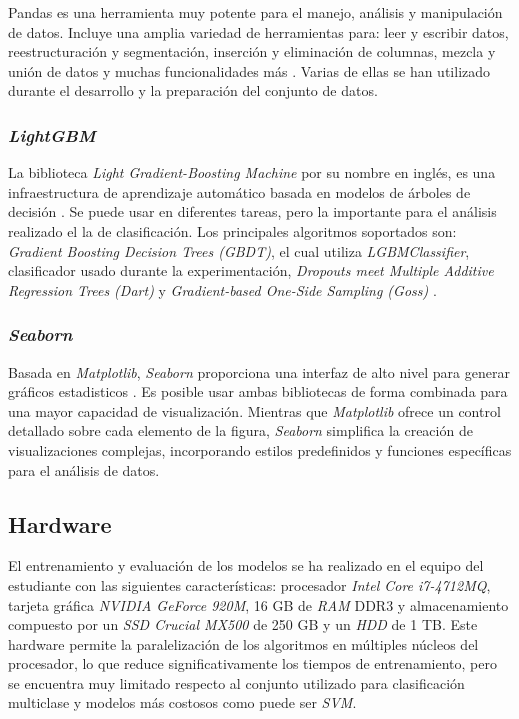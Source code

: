 Pandas es una herramienta muy potente para el manejo, análisis y manipulación de datos. Incluye una amplia variedad de herramientas para: leer y escribir datos, reestructuración y segmentación, inserción y eliminación de columnas, mezcla y unión de datos y muchas funcionalidades más \cite{pandas}. Varias de ellas se han utilizado durante el desarrollo y la preparación del conjunto de datos.

\subsubsection{\textit{LightGBM}}
\label{subsubsec:lightgbm}

La biblioteca \textit{Light Gradient-Boosting Machine} por su nombre en inglés, es una infraestructura de aprendizaje automático basada en modelos de árboles de decisión \cite{lgbm}. Se puede usar en diferentes tareas, pero la importante para el análisis realizado el la de clasificación. Los principales algoritmos soportados son: \textit{Gradient Boosting Decision Trees (GBDT)}, el cual utiliza \textit{LGBMClassifier}, clasificador usado durante la experimentación, \textit{Dropouts meet Multiple Additive Regression Trees (Dart)} y \textit{Gradient-based One-Side Sampling (Goss)} \cite{lgbm_alg}.

\subsubsection{\textit{Seaborn}}
\label{subsubsec:seaborn}

Basada en \textit{Matplotlib}, \textit{Seaborn} proporciona una interfaz de alto nivel para generar gráficos estadisticos \cite{seaborn}. Es posible usar ambas bibliotecas de forma combinada para una mayor capacidad de visualización. Mientras que \textit{Matplotlib} ofrece un control detallado sobre cada elemento de la figura, \textit{Seaborn} simplifica la creación de visualizaciones complejas, incorporando estilos predefinidos y funciones específicas para el análisis de datos.

\subsection{Hardware}
\label{subsec:hw_usado}

El entrenamiento y evaluación de los modelos se ha realizado en el equipo del estudiante con las siguientes características: procesador \textit{Intel Core i7-4712MQ}, tarjeta gráfica \textit{NVIDIA GeForce 920M}, 16 GB de \textit{RAM} DDR3 y almacenamiento compuesto por un \textit{SSD Crucial MX500} de 250 GB y un \textit{HDD} de 1 TB. Este hardware permite la paralelización de los algoritmos en múltiples núcleos del procesador, lo que reduce significativamente los tiempos de entrenamiento, pero se encuentra muy limitado respecto al conjunto utilizado para clasificación multiclase y modelos más costosos como puede ser \textit{SVM}.

